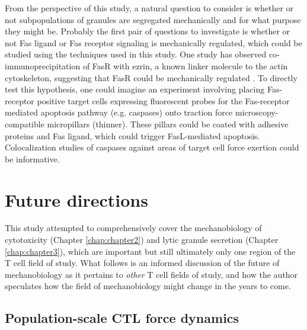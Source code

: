 From the perspective of this study,  a natural question to consider is whether or not subpopulations of granules are segregated mechanically and for what purpose they might be. Probably the first pair of questions to investigate is whether or not Fas ligand or Fas receptor signaling is mechanically regulated, which could be studied using the techniques used in this study. One study has observed co-immunoprecipitation of FasR with ezrin, a known linker molecule to the actin cytoskeleton, suggesting that FasR could be mechanically regulated \cite{Parlato2000}. To directly test this hypothesis, one could imagine an experiment involving placing Fas-receptor positive target cells expressing fluorescent probes for the Fas-receptor mediated apoptosis pathway (e.g. caspases) onto traction force microscopy-compatible micropillars (thinner). These pillars could be coated with adhesive proteins and Fas ligand, which could trigger FasL-mediated apoptosis. Colocalization studies of caspases against areas of target cell force exertion could be informative.

\section{Future directions}

This study attempted to comprehensively cover the mechanobiology of cytotoxicity (Chapter \ref{chap:chapter2}) and lytic granule secretion (Chapter \ref{chap:chapter3}), which are important but still ultimately only one region of the T cell field of study. What follows is an informed discussion of the future of mechanobiology as it pertains to \textit{other} T cell fields of study, and how the author speculates how the field of mechanobiology might change in the years to come.

\subsection{Population-scale CTL force dynamics}

